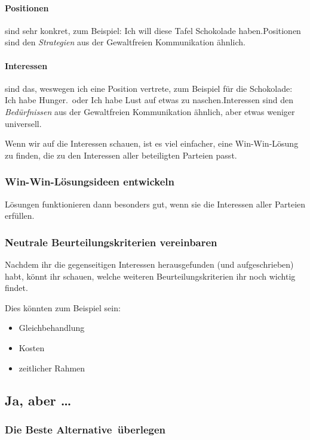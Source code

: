 \paragraph{Positionen} sind sehr konkret, zum Beispiel: \glqq Ich will diese Tafel Schokolade haben.\grqq Positionen sind den \emph{Strategien} aus der Gewaltfreien Kommunikation ähnlich.

\paragraph{Interessen} sind das, weswegen ich eine Position vertrete, zum Beispiel für die Schokolade: \glqq Ich habe Hunger.\grqq\ oder \glqq Ich habe Lust auf etwas zu naschen.\grqq Interessen sind den \emph{Bedürfnissen} aus der Gewaltfreien Kommunikation ähnlich, aber etwas weniger universell.

Wenn wir auf die Interessen schauen, ist es viel einfacher, eine Win-Win-Lösung zu finden, die zu den Interessen aller beteiligten Parteien passt.


\subsubsection{Win-Win-Lösungsideen entwickeln}

Lösungen funktionieren dann besonders gut, wenn sie die Interessen aller Parteien erfüllen.


\subsubsection{Neutrale Beurteilungskriterien vereinbaren}

Nachdem ihr die gegenseitigen Interessen herausgefunden (und aufgeschrieben) habt, könnt ihr schauen, welche weiteren Beurteilungskriterien ihr noch wichtig findet.

Dies könnten zum Beispiel sein:

\begin{itemize}
  \item Gleichbehandlung
  \item Kosten
  \item zeitlicher Rahmen
\end{itemize}


\subsection{Ja, aber \ldots}


\subsubsection{Die \glqq Beste Alternative\grqq\ überlegen}

